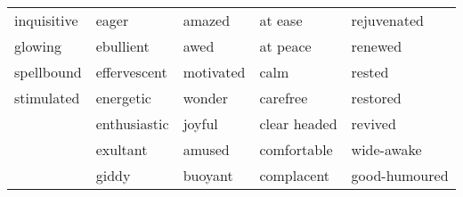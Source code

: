 \begin{small}
\begin{longtable}{ p{} p{}  p{}  p{}  p{} }
                inquisitive & eager & amazed & at ease & rejuvenated \\
                glowing & ebullient & awed & at peace & renewed \\
                spellbound & effervescent & motivated & calm & rested \\
                stimulated & energetic & wonder & carefree & restored \\
                & enthusiastic & joyful & clear headed & revived \\
                & exultant & amused & comfortable & wide-awake \\
                & giddy & buoyant & complacent & good-humoured \\
                \bottomrule
        \end{longtable}
\end{small}


